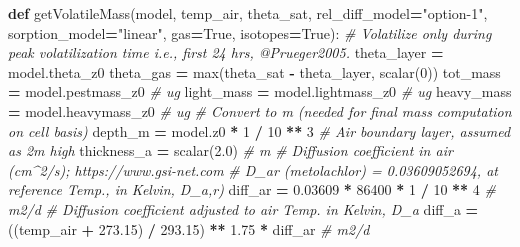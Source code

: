 \documentclass[]{article}
\newenvironment{Shaded}{\begin{snugshade}}{\end{snugshade}}
\newcommand{\KeywordTok}[1]{\textcolor[rgb]{0.13,0.29,0.53}{\textbf{{#1}}}}
\newcommand{\DecValTok}[1]{\textcolor[rgb]{0.00,0.00,0.81}{{#1}}}
\newcommand{\FloatTok}[1]{\textcolor[rgb]{0.00,0.00,0.81}{{#1}}}
\newcommand{\StringTok}[1]{\textcolor[rgb]{0.31,0.60,0.02}{{#1}}}
\newcommand{\CommentTok}[1]{\textcolor[rgb]{0.56,0.35,0.01}{\textit{{#1}}}}
\newcommand{\VariableTok}[1]{\textcolor[rgb]{0.00,0.00,0.00}{{#1}}}
\newcommand{\OperatorTok}[1]{\textcolor[rgb]{0.81,0.36,0.00}{\textbf{{#1}}}}
\newcommand{\BuiltInTok}[1]{{#1}}
\newcommand{\NormalTok}[1]{{#1}}
\begin{document}
\begin{Shaded}
\begin{Highlighting}[]

\KeywordTok{def} \NormalTok{getVolatileMass(model, temp_air, theta_sat,}
                    \NormalTok{rel_diff_model}\OperatorTok{=}\StringTok{"option-1"}\NormalTok{, sorption_model}\OperatorTok{=}\StringTok{"linear"}\NormalTok{,}
                    \NormalTok{gas}\OperatorTok{=}\VariableTok{True}\NormalTok{, isotopes}\OperatorTok{=}\VariableTok{True}\NormalTok{):}
    \CommentTok{# Volatilize only during peak volatilization time i.e., first 24 hrs, @Prueger2005.}
    \NormalTok{theta_layer }\OperatorTok{=} \NormalTok{model.theta_z0}
    \NormalTok{theta_gas }\OperatorTok{=} \BuiltInTok{max}\NormalTok{(theta_sat }\OperatorTok{-} \NormalTok{theta_layer, scalar(}\DecValTok{0}\NormalTok{))}
    \NormalTok{tot_mass }\OperatorTok{=} \NormalTok{model.pestmass_z0  }\CommentTok{# ug}
    \NormalTok{light_mass }\OperatorTok{=} \NormalTok{model.lightmass_z0  }\CommentTok{# ug}
    \NormalTok{heavy_mass }\OperatorTok{=} \NormalTok{model.heavymass_z0  }\CommentTok{# ug}
    \CommentTok{# Convert to m (needed for final mass computation on cell basis)}
    \NormalTok{depth_m }\OperatorTok{=} \NormalTok{model.z0 }\OperatorTok{*} \DecValTok{1} \OperatorTok{/} \DecValTok{10} \OperatorTok{**} \DecValTok{3}
    \CommentTok{# Air boundary layer, assumed as 2m high}
    \NormalTok{thickness_a }\OperatorTok{=} \NormalTok{scalar(}\FloatTok{2.0}\NormalTok{)  }\CommentTok{# m}
    \CommentTok{# Diffusion coefficient in air (cm^2/s); https://www.gsi-net.com}
    \CommentTok{#  D_ar (metolachlor) = 0.03609052694,  at reference Temp., in Kelvin, D_a,r)}
    \NormalTok{diff_ar }\OperatorTok{=} \FloatTok{0.03609} \OperatorTok{*} \DecValTok{86400} \OperatorTok{*} \DecValTok{1} \OperatorTok{/} \DecValTok{10} \OperatorTok{**} \DecValTok{4}  \CommentTok{# m2/d}
    \CommentTok{# Diffusion coefficient adjusted to air Temp. in Kelvin, D_a}
    \NormalTok{diff_a }\OperatorTok{=} \NormalTok{((temp_air }\OperatorTok{+} \FloatTok{273.15}\NormalTok{) }\OperatorTok{/} \FloatTok{293.15}\NormalTok{) }\OperatorTok{**} \FloatTok{1.75} \OperatorTok{*} \NormalTok{diff_ar  }\CommentTok{# m2/d}


\end{Highlighting}
\end{Shaded}
\end{document}
